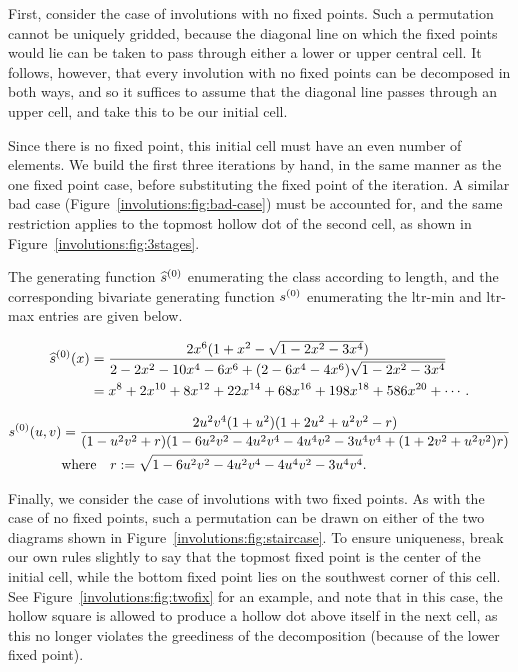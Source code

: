     First, consider the case of involutions with no fixed points. Such a
    permutation cannot be uniquely gridded, because the diagonal line on which
    the fixed points would lie can be taken to pass through either a lower or
    upper central cell. It follows, however, that every involution with no
    fixed points can be decomposed in both ways, and so it suffices to assume
    that the diagonal line passes through an upper cell, and take this to be
    our initial cell. 

    Since there is no fixed point, this initial cell must have an even number
    of elements. We build the first three iterations by hand, in the same
    manner as the one fixed point case, before substituting the fixed point of
    the iteration. A similar bad case (Figure~\ref{involutions:fig:bad-case})
    must be accounted for, and the same restriction applies to the topmost
    hollow dot of the second cell, as shown in
    Figure~\ref{involutions:fig:3stages}. 

    The generating function $\widehat{s}^{(0)}$ enumerating the class according to length, and the
    corresponding bivariate generating function $s^{(0)}$ enumerating the
    ltr-min and ltr-max entries are given below. 

    {\small
    \begin{equation} \label{involutions:eqn:htszero}
      \begin{split}
      \widehat{s}^{(0)}(x) &=
      \frac{2x^6(1+x^2-\sqrt{1-2x^2-3x^4})}{2-2x^2-10x^4-6x^6+(2-6x^4-4x^6)\sqrt{1-2x^2-3x^4}}\\
      &= x^8+2x^{10}+8x^{12}+22x^{14}+68x^{16}+198x^{18}+586x^{20}+\cdots.
      \end{split}
    \end{equation}

    \begin{equation} \label{involutions:eqn:szero}
      \begin{split}
      s^{(0)}(u,v)
      &= \frac{2u^2v^4(1+u^2)(1+2u^2+u^2v^2-r)}
      {(1-u^2v^2+r)(1-6u^2v^2-4u^2v^4-4u^4v^2-3u^4v^4+(1+2v^2+u^2v^2)r)} \\
        &\text{where} \quad r := \sqrt{1-6u^2v^2-4u^2v^4-4u^4v^2-3u^4v^4}.
      \end{split}
    \end{equation}
    }


    Finally, we consider the case of involutions with two fixed points. As with
    the case of no fixed points, such a permutation can be drawn on either of
    the two diagrams shown in Figure~\ref{involutions:fig:staircase}. To ensure
    uniqueness, break our own rules slightly to say that the topmost fixed
    point is the center of the initial cell, while the bottom fixed point lies
    on the southwest corner of this cell. See
    Figure~\ref{involutions:fig:twofix} for an example, and note that in this
    case, the hollow square is allowed to produce a hollow dot above itself in
    the next cell, as this no longer violates the greediness of the
    decomposition (because of the lower fixed point). 

